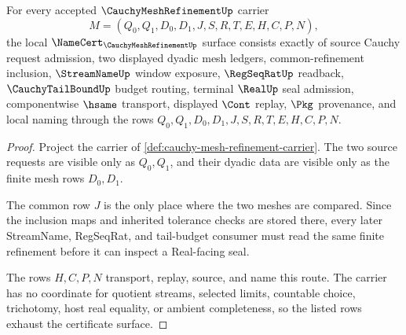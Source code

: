 \begin{theorem}
\label{thm:cauchy-mesh-refinement-namecert-obligations}
For every accepted $\CauchyMeshRefinementUp$ carrier
$$
M=(Q_0,Q_1,D_0,D_1,J,S,R,T,E,H,C,P,N),
$$
the local $\NameCert_{\CauchyMeshRefinementUp}$ surface consists exactly of source Cauchy request admission, two displayed dyadic mesh ledgers, common-refinement inclusion, $\StreamNameUp$ window exposure, $\RegSeqRatUp$ readback, $\CauchyTailBoundUp$ budget routing, terminal $\RealUp$ seal admission, componentwise $\hsame$ transport, displayed $\Cont$ replay, $\Pkg$ provenance, and local naming through the rows $Q_0,Q_1,D_0,D_1,J,S,R,T,E,H,C,P,N$.
\end{theorem}
\begin{proof}
Project the carrier of \autoref{def:cauchy-mesh-refinement-carrier}. The two source requests are visible only as $Q_0,Q_1$, and their dyadic data are visible only as the finite mesh rows $D_0,D_1$.

The common row $J$ is the only place where the two meshes are compared. Since the inclusion maps and inherited tolerance checks are stored there, every later StreamName, RegSeqRat, and tail-budget consumer must read the same finite refinement before it can inspect a Real-facing seal.

The rows $H,C,P,N$ transport, replay, source, and name this route. The carrier has no coordinate for quotient streams, selected limits, countable choice, trichotomy, host real equality, or ambient completeness, so the listed rows exhaust the certificate surface.
\end{proof}


